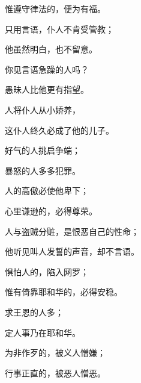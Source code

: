 {\par }{\Q 惟遵守律法的，便为有福。
\par }{\Q {}只用言语，仆人不肯受管教；
\par }{\Q 他虽然明白，也不留意。
\par }{\Q {}你见言语急躁的人吗？
\par }{\Q 愚昧人比他更有指望。
\par }{\Q {}人将仆人从小娇养，
\par }{\Q 这仆人终久必成了他的儿子。
\par }{\Q {}好气的人挑启争端；
\par }{\Q 暴怒的人多多犯罪。
\par }{\Q {}人的高傲必使他卑下；
\par }{\Q 心里谦逊的，必得尊荣。
\par }{\Q {}人与盗贼分赃，是恨恶自己的性命；
\par }{\Q 他听见叫人发誓的声音，却不言语。
\par }{\Q {}惧怕人的，陷入网罗；
\par }{\Q 惟有倚靠耶和华的，必得安稳。
\par }{\Q {}求王恩的人多；
\par }{\Q 定人事乃在耶和华。
\par }{\Q {}为非作歹的，被义人憎嫌；
\par }{\Q 行事正直的，被恶人憎恶。

}
